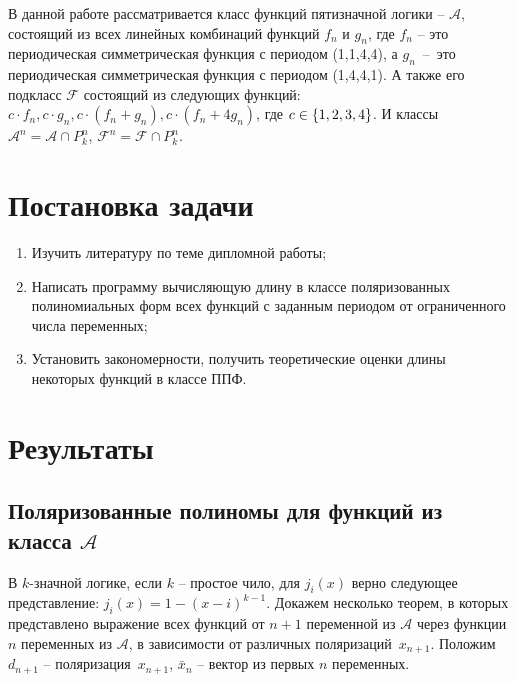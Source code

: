 \documentclass[bibliography=totoc, a4paper, 14pt]{extarticle}
\let\stdsection\section
\renewcommand\section{\newpage\stdsection}
\def\in{\mathchar"3232\nobreak\discretionary{}{\usefont{OMS}{cmsy}{m}{n}\char50}{}}
\begin{document}
В данной работе рассматривается класс функций пятизначной логики \nobreakdash-- $\mathcal{A}$,
состоящий из всех линейных комбинаций функций $f_n$ и $g_n$, где $f_n$ -- это периодическая
симметрическая функция с периодом (1,1,4,4), а \mbox{$g_n$ -- это} периодическая симметрическая
функция с периодом (1,4,4,1). А также его подкласс $\mathcal{F}$ состоящий из следующих функций:
$c \cdot f_n,c \cdot g_n,c \cdot (f_n+g_n),c \cdot (f_n+4g_n)$, где $c \in \{1,2,3,4\}$. И классы
$\mathcal{A}^n = \mathcal{A} \cap P_k^n$, $\mathcal{F}^n = \mathcal{F} \cap P_k^n$.


\section{Постановка задачи}
\begin{enumerate}
\item Изучить литературу по теме дипломной работы;
\item Написать программу вычисляющую длину в классе поляризованных полиномиальных форм всех функций
    с заданным периодом от ограниченного числа переменных;
\item Установить закономерности, получить теоретические оценки длины некоторых функций в классе ППФ.
\end{enumerate}

\section{Результаты}
\subsection{Поляризованные полиномы для функций из класса $\mathcal{A}$}

В $k$-значной логике, если $k$ -- простое чило, для $j_i(x)$ верно следующее представление:
$j_i(x) = 1 - (x-i)^{k-1}$. Докажем несколько теорем, в которых представлено выражение всех функций
от $n+1$ переменной из $\mathcal{A}$ через функции $n$ переменных из $\mathcal{A}$, в зависимости от
различных поляризаций~$x_{n+1}$. Положим $d_{n+1}$ -- поляризация~$x_{n+1}$, $\bar{x}_n$ -- вектор
из первых $n$ переменных.
\end{document}
